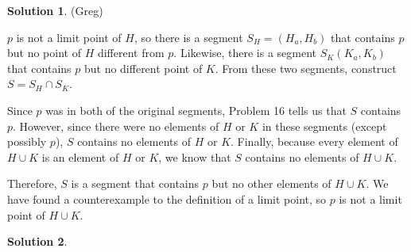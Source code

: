 \documentclass{article}
\theoremstyle{definition}
\newtheorem{solution}{Solution}
\begin{document}
\begin{solution} %
(Greg)

$p$ is not a limit point of $H$, so there is a segment $S_H = (H_a, H_b)$ that contains $p$ but no point of $H$ different from $p$.
Likewise, there is a segment $S_K (K_a, K_b)$ that contains $p$ but no different point of $K$.
From these two segments, construct $S = S_H \cap S_K$. 

Since $p$ was in both of the original segments, Problem 16 tells us that $S$ contains $p$.
However, since there were no elements of $H$ or $K$ in these segments (except possibly $p$), $S$ contains no elements of $H$ or $K$.
Finally, because every element of $H \cup K$ is an element of $H$ or $K$, we know that $S$ contains no elements of $H \cup K$.

Therefore, $S$ is a segment that contains $p$ but no other elements of $H \cup K$.
We have found a counterexample to the definition of a limit point, so $p$ is not a limit point of $H \cup K$.
\end{solution}

\begin{solution} %
\end{solution}
\end{document}
